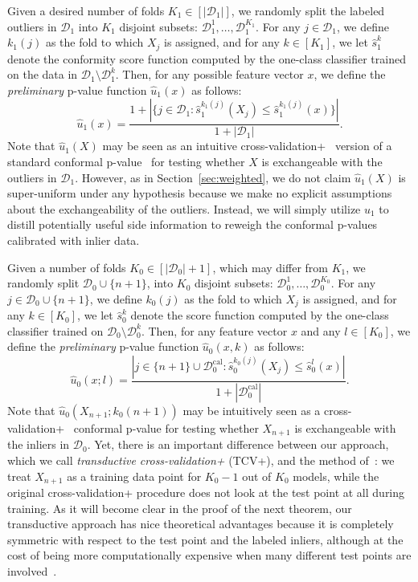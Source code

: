 \documentclass[11pt]{article}
\begin{document}
Given a desired number of folds $K_1 \in [|\mathcal{D}_1|]$, we randomly split the labeled outliers in $\mathcal{D}_1$ into $K_1$ disjoint subsets: $\mathcal{D}_1^1, \dots, \mathcal{D}_1^{K_1}$.
For any $j \in \mathcal{D}_1$, we define $k_1(j)$ as the fold to which $X_j$ is assigned, and for any $k \in [K_1]$, we let $\hat{s}_1^{k}$ denote the conformity score function computed by the one-class classifier trained on the data in $\mathcal{D}_1 \setminus \mathcal{D}_1^{k}$.
Then, for any possible feature vector $x$, we define the {\em preliminary} p-value function $\hat{u}_1(x)$ as follows:
\begin{equation}\label{eq:cv++_pval_1}
  \hat{u}_1(x) = \frac{1+| \{j \in \mathcal{D}_1:  \hat{s}_1^{k_1(j)}(X_{j}) \leq \hat{s}_1^{k_1(j)}(x) \}| } {1+|\mathcal{D}_1|}.
\end{equation}
Note that $\hat{u}_1(X)$ may be seen as an intuitive cross-validation+~\cite{barber2019predictive} version of a standard conformal p-value~\cite{bates2021testing} for testing whether $X$ is exchangeable with the outliers in $\mathcal{D}_1$. However, as in Section~\ref{sec:weighted}, we do not claim $\hat{u}_1(X)$ is super-uniform under any hypothesis because we make no explicit assumptions about the exchangeability of the outliers.
Instead, we will simply utilize $\hat{u}_1$ to distill potentially useful side information to reweigh the conformal p-values calibrated with inlier data.

Given a number of folds $K_0 \in [|\mathcal{D}_0|+1]$, which may differ from $K_1$, we randomly split $\mathcal{D}_0 \cup \{n+1\}$, into $K_0$ disjoint subsets: $\mathcal{D}_0^1, \dots, \mathcal{D}_0^{K_0}$.
For any $j \in \mathcal{D}_0 \cup \{n+1\}$, we define $k_0(j)$ as the fold to which $X_j$ is assigned, and for any $k \in [K_0]$, we let $\hat{s}_0^{k}$ denote the score function computed by the one-class classifier trained on $\mathcal{D}_0 \setminus \mathcal{D}_0^{k}$.
Then, for any feature vector $x$ and any $l \in [K_0]$, we define the {\em preliminary} p-value function $\hat{u}_0(x,k)$ as follows:
\begin{equation}\label{eq:cv++_pval_0}
  \hat{u}_0(x; l) = \frac{|j\in \{n+1\} \cup \mathcal{D}_{0}^{\mathrm{cal}} : \hat{s}_0^{k_0(j)}(X_j) \leq \hat{s}_0^{l}(x) |}{1+|\mathcal{D}_{0}^{\mathrm{cal}}|}.
\end{equation}
Note that $\hat{u}_0(X_{n+1}; k_0(n+1))$ may be intuitively seen as a cross-validation+~\cite{barber2019predictive} conformal p-value for testing whether $X_{n+1}$ is exchangeable with the inliers in $\mathcal{D}_0$. Yet, there is an important difference between our approach, which we call {\em transductive cross-validation+} (TCV+), and the method of~\cite{barber2019predictive}: we treat $X_{n+1}$ as a training data point for $K_0-1$ out of $K_0$ models, while the original cross-validation+ procedure does not look at the test point at all during training.
As it will become clear in the proof of the next theorem, our transductive approach has nice theoretical advantages because it is completely symmetric with respect to the test point and the labeled inliers, although at the cost of being more computationally expensive when many different test points are involved~\cite{vovk2013transductive}.
\end{document}
